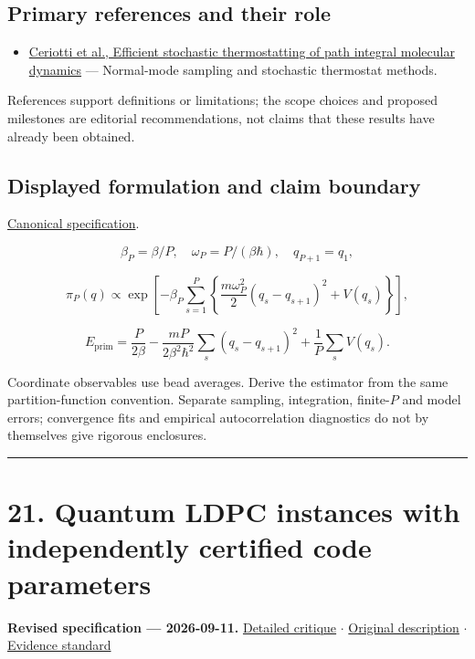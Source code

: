 \documentclass[
  11pt,
]{article}
\providecommand{\tightlist}{%
  \setlength{\itemsep}{0pt}\setlength{\parskip}{0pt}}
\begin{document}
\subsection{Primary references and their role}

\begin{itemize}
\tightlist
\item
  \href{https://arxiv.org/abs/1009.1045}{Ceriotti et al., Efficient
  stochastic thermostatting of path integral molecular dynamics} ---
  Normal-mode sampling and stochastic thermostat methods.
\end{itemize}

References support definitions or limitations; the scope choices and
proposed milestones are editorial recommendations, not claims that these
results have already been obtained.

\subsection{Displayed formulation and claim boundary}

\href{https://github.com/rick-stevens-ai/Pure-Thought/blob/main/PRDs/20-Ab-Initio-Path-Integrals.md}{Canonical
specification}.

\[\beta_P=\beta/P,\quad\omega_P=P/(\beta\hbar),\quad q_{P+1}=q_1,\]

\[\pi_P(q)\propto\exp\!\left[-\beta_P\sum_{s=1}^P
\left\{\frac{m\omega_P^2}{2}(q_s-q_{s+1})^2+V(q_s)\right\}\right],\]

\[E_{\mathrm{prim}}=\frac{P}{2\beta}
-\frac{mP}{2\beta^2\hbar^2}\sum_s(q_s-q_{s+1})^2
+\frac1P\sum_sV(q_s).\]

Coordinate observables use bead averages. Derive the estimator from the
same partition-function convention. Separate sampling, integration,
finite-\(P\) and model errors; convergence fits and empirical
autocorrelation diagnostics do not by themselves give rigorous
enclosures.

\begin{center}\rule{0.5\linewidth}{0.5pt}\end{center}

\section{21. Quantum LDPC instances with independently certified code
parameters}

\textbf{Revised specification --- 2026-09-11.}
\href{https://github.com/rick-stevens-ai/Pure-Thought/blob/main/reviews/21-Quantum-LDPC-Codes.md}{Detailed
critique} \ensuremath{\cdot}
\href{https://github.com/rick-stevens-ai/Pure-Thought/blob/main/archive/original-PRDs/21-Quantum-LDPC-Codes.md}{Original
description} \ensuremath{\cdot}
\href{https://github.com/rick-stevens-ai/Pure-Thought/blob/main/reviews/EVIDENCE-STANDARD.md}{Evidence
standard}
\end{document}

